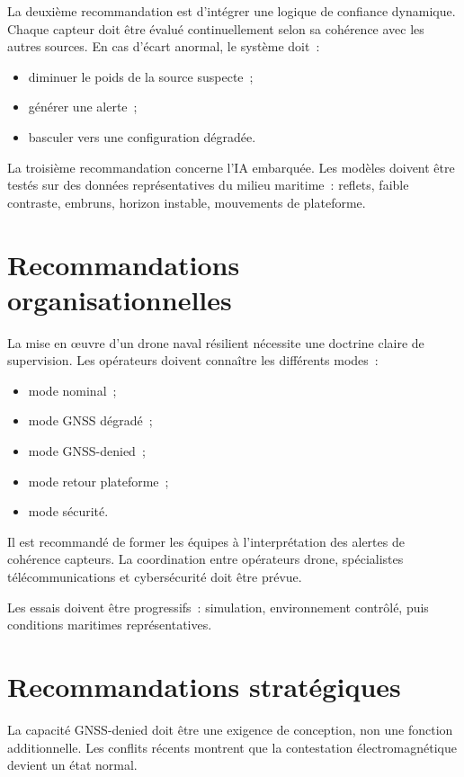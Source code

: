 \documentclass[12pt, a4paper, twoside, openright]{report}
\begin{document}
La deuxième recommandation est d'intégrer une logique de confiance dynamique. Chaque capteur doit être évalué continuellement selon sa cohérence avec les autres sources. En cas d'écart anormal, le système doit~:

\begin{itemize}
    \item diminuer le poids de la source suspecte~;
    \item générer une alerte~;
    \item basculer vers une configuration dégradée.
\end{itemize}

La troisième recommandation concerne l'IA embarquée. Les modèles doivent être testés sur des données représentatives du milieu maritime~: reflets, faible contraste, embruns, horizon instable, mouvements de plateforme.

\section{Recommandations organisationnelles}

La mise en œuvre d'un drone naval résilient nécessite une doctrine claire de supervision. Les opérateurs doivent connaître les différents modes~:

\begin{itemize}
    \item mode nominal~;
    \item mode GNSS dégradé~;
    \item mode GNSS-denied~;
    \item mode retour plateforme~;
    \item mode sécurité.
\end{itemize}

Il est recommandé de former les équipes à l'interprétation des alertes de cohérence capteurs. La coordination entre opérateurs drone, spécialistes télécommunications et cybersécurité doit être prévue.

Les essais doivent être progressifs~: simulation, environnement contrôlé, puis conditions maritimes représentatives.

\section{Recommandations stratégiques}

La capacité GNSS-denied doit être une exigence de conception, non une fonction additionnelle. Les conflits récents montrent que la contestation électromagnétique devient un état normal.
\end{document}
